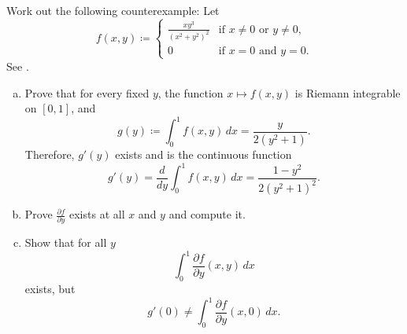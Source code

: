\begin{myfigureht}
\caption{The graph $z= \frac{xy^3}{{(x^2+y^2)}^2}$ on
$[0,1] \times [0,1]$.\label{fig:diffunderex916}}
\end{myfigureht}

\begin{exercise}
\pagebreak[2]
Work out the following counterexample:  Let
\begin{equation*}
f(x,y) \coloneqq
\begin{cases}
\frac{xy^3}{{(x^2+y^2)}^2} & \text{if } x \neq 0 \text{ or } y \neq 0, \\
0                          & \text{if } x = 0 \text{ and } y = 0.
\end{cases}
\end{equation*}
See .
\begin{enumerate}[a)]
\item
Prove that for every fixed $y$, the function $x \mapsto f(x,y)$ is
Riemann integrable on $[0,1]$, and
\begin{equation*}
g(y) \coloneqq \int_0^1 f(x,y) \, dx = \frac{y}{2(y^2+1)} .
\end{equation*}
Therefore, $g'(y)$ exists and is the continuous function
\begin{equation*}
g'(y) =
\frac{d}{dy} \int_0^1 f(x,y) \, dx
=
\frac{1-y^2}{2{(y^2+1)}^2} .
\end{equation*}
\item
Prove $\frac{\partial f}{\partial y}$ exists at all $x$ and $y$ and
compute it.
\item
Show that for all $y$
\begin{equation*}
\int_0^1 \frac{\partial f}{\partial y} (x,y) \, dx
\end{equation*}
exists, but
\begin{equation*}
g'(0) \neq \int_0^1 \frac{\partial f}{\partial y} (x,0) \, dx .
\end{equation*}
\end{enumerate}
\end{exercise}

